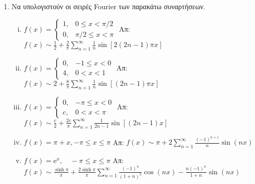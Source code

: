 


\geometry{top=1.5cm}

\everymath{\displaystyle}
\pagestyle{askhseis}


\begin{center}
  \minibox{\large\bfseries  \textcolor{Col1}{Σειρές Fourier}}
\end{center}

\vspace{\baselineskip}

\begin{enumerate}
  \item Να υπολογιστούν οι σειρές Fourier των παρακάτω συναρτήσεων.
    \begin{enumerate}[i),itemsep=.5\baselineskip]
      \item $ f(x)=
        \begin{cases} 
          1, & 0 \leq x < \pi /2 \\
          0, & \pi /2 \leq x < \pi
        \end{cases} $ 
        \hfill Απ: $ f(x) \sim \frac{1}{2} + \frac{2}{\pi} \sum_{n=1}^{\infty} 
        \frac{1}{n} \sin{[2(2n-1) \pi x]} $ 

      \item $ f(x) = 
         \begin{cases}
           0, & -1 \leq x < 0 \\
           4, & 0 < x < 1
         \end{cases}$
         \hfill Απ: $ f(x) \sim 2 + \frac{8}{\pi} \sum_{n=1}^{\infty} \frac{1}{n} 
         \sin{[(2n-1) \pi x]} $

      \item $ f(x) = 
         \begin{cases}
           0, & - \pi \leq x < 0 \\
           c, & 0 < x < \pi 
         \end{cases}$
         \hfill Απ: $ f(x) \sim \frac{c}{2} + \frac{2c}{\pi} \sum_{n=1}^{\infty}
         \frac{1}{2n-1} \sin{[(2n-1)x]} $ 

       \item $ f(x) = \pi + x , - \pi \leq x \leq \pi $ 
         \hfill Απ: $ f(x) \sim \pi + 2 \sum_{n=1}^{\infty} \frac{(-1)^{n+1}}{n}
         \sin{(nx)} $ 

       \item $ f(x) = \mathrm{e}^{x} , \quad - \pi \leq x \leq \pi $
         \hfill Απ: $ f(x) \sim \frac{\sinh{\pi}}{\pi} + \frac{2 \sinh{\pi}}{\pi} 
         \sum_{n=1}^{\infty} \frac{(-1)^{n}}{(1+n)^{2}} \cos{(nx)} - 
         \frac{n(-1)^{n}}{1+n} \sin{(nx)} $ 
    \end{enumerate}


\end{enumerate}
